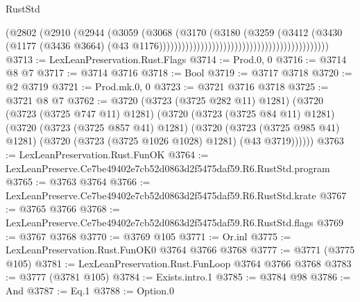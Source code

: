 \begin{lexlean}{RustStd}
\begin{coremodule}
                                                                      (@2802
                                                                        (@2910
                                                                          (@2944
                                                                            (@3059
                                                                              (@3068
                                                                                (@3170
                                                                                  (@3180
                                                                                    (@3259
                                                                                      (@3412
                                                                                        (@3430
                                                                                          (@1177
                                                                                            (@3436
                                                                                              @3664)
                                                                                            (@43
                                                                                              @1176)))))))))))))))))))))))))))))))))))))))))))))
@3713 := LexLeanPreservation.Rust.Flags
@3714 := Prod.{0, 0}
@3716 := @3714 @8 @7
@3717 := @3714 @3716
@3718 := Bool
@3719 := @3717 @3718
@3720 := @2 @3719
@3721 := Prod.mk.{0, 0}
@3723 := @3721 @3716 @3718
@3725 := @3721 @8 @7
@3762 := @3720
    (@3723 (@3725 @282 @11) @1281)
    (@3720
      (@3723 (@3725 @747 @11) @1281)
      (@3720
        (@3723 (@3725 @84 @11) @1281)
        (@3720
          (@3723 (@3725 @857 @41) @1281)
          (@3720
            (@3723 (@3725 @985 @41) @1281)
            (@3720 (@3723 (@3725 @1026 @1028) @1281) (@43 @3719))))))
@3763 := LexLeanPreservation.Rust.FunOK
@3764 := LexLeanPreserve.Ce7be49402e7cb52d0863d2f5475daf59.R6.RustStd.program
@3765 := @3763 @3764
@3766 := LexLeanPreserve.Ce7be49402e7cb52d0863d2f5475daf59.R6.RustStd.krate
@3767 := @3765 @3766
@3768 := LexLeanPreserve.Ce7be49402e7cb52d0863d2f5475daf59.R6.RustStd.flags
@3769 := @3767 @3768
@3770 := @3769 @105
@3771 := Or.inl
@3775 := LexLeanPreservation.Rust.FunOK0 @3764 @3766 @3768
@3777 := @3771 (@3775 @105)
@3781 := LexLeanPreservation.Rust.FunLoop @3764 @3766 @3768
@3783 := @3777 (@3781 @105)
@3784 := Exists.intro.{1}
@3785 := @3784 @98
@3786 := And
@3787 := Eq.{1}
@3788 := Option.{0}

\end{coremodule}
\end{lexlean}
